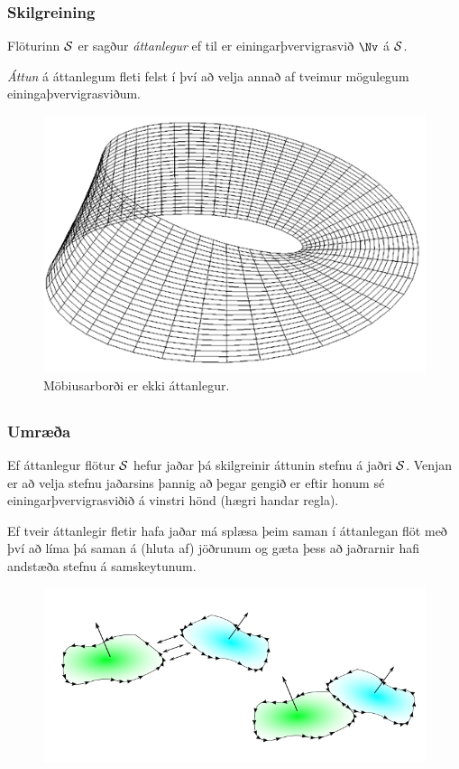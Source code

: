 \subsubsection{Skilgreining \rtask{}}

Flöturinn $\cal S$ er sagður {\em áttanlegur} ef til er einingarþvervigrasvið
$\Nv$ á $\cal S$.  

\medskip
{\em Áttun} á áttanlegum fleti felst í því að velja annað af tveimur
mögulegum einingaþvervigrasviðum. 


\begin {figure}[h!]
 \centering
            \includegraphics[width=0.40\linewidth]{mobius.png}
            \caption*{Möbiusarborði er ekki áttanlegur.}
\end {figure}


\subsection{}
 \subsubsection{Umræða \rtask{}}
  Ef áttanlegur flötur $\cal S$ hefur jaðar þá skilgreinir áttunin stefnu á jaðri $\cal S$. Venjan er að velja stefnu jaðarsins þannig að þegar gengið er eftir honum sé einingarþvervigrasviðið á vinstri hönd (hægri handar regla).
  
  \bigskip
  Ef tveir áttanlegir fletir hafa jaðar má splæsa þeim saman í áttanlegan flöt með því að líma þá saman á (hluta af) jöðrunum og gæta þess að jaðrarnir hafi andstæða stefnu á samskeytunum.
 

\begin {figure}[h!]
 \centering
            \includegraphics[width=0.95\linewidth]{joinsurf.png}
            \caption*{}
\end {figure}


